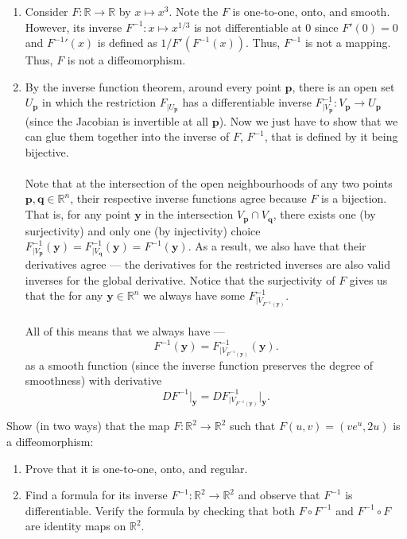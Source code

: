 \documentclass[12 pt, letterpaper]{hmcpset}
\begin{document}
\begin{solution}
	\begin{enumerate}
		\item
			Consider $F : \mathbb{R} \to \mathbb{R}$ by $x \mapsto x^3$. Note the $F$ is one-to-one, onto, and smooth. However, its inverse $F^{-1} : x \mapsto x^{1/3}$ is not differentiable at $0$ since $F'(0) = 0$ and ${F^{-1}}'(x)$ is defined as $1/F'(F^{-1}(x))$. Thus, $F^{-1}$ is not a mapping. Thus, $F$ is not a diffeomorphism.
		\item
			By the inverse function theorem, around every point $\mathbf{p}$, there is an open set $U_{\mathbf{p}}$ in which the restriction $F_{|U_{\mathbf{p}}}$ has a differentiable inverse $F^{-1}_{|V_{\mathbf{p}}} : V_{\mathbf{p}} \to U_{\mathbf{p}}$ (since the Jacobian is invertible at all $\mathbf{p}$). Now we just have to show that we can glue them together into the inverse of $F$, $F^{-1}$, that is defined by it being bijective. \\\\
			Note that at the intersection of the open neighbourhoods of any two points $\mathbf{p}, \mathbf{q} \in \mathbb{R}^n$, their respective inverse functions agree because $F$ is a bijection. That is, for any point $\mathbf{y}$ in the intersection $V_\mathbf{p} \cap V_\mathbf{q}$, there exists one (by surjectivity) and only one (by injectivity) choice $F^{-1}_{|V_\mathbf{p}}(\mathbf{y}) = F^{-1}_{|V_\mathbf{q}}(\mathbf{y}) = F^{-1}(\mathbf{y})$. As a result, we also have that their derivatives agree --- the derivatives for the restricted inverses are also valid inverses for the global derivative. Notice that the surjectivity of $F$ gives us that the for any $\mathbf{y} \in \mathbb{R}^{n}$ we always have some $F^{-1}_{|V_{F^{-1}(\mathbf{y})}}$. \\\\
			All of this means that we always have ---
			\[
				F^{-1}(\mathbf{y}) = F^{-1}_{|V_{F^{-1}(\mathbf{y})}}(\mathbf{y}).
			\]
			as a smooth function (since the inverse function preserves the degree of smoothness) with derivative
			\[
				DF^{-1} \Big |_{\mathbf{y}} = DF^{-1}_{|V_{F^{-1}(\mathbf{y})}} \Big |_{\mathbf{y}}.
			\]
	\end{enumerate}
\end{solution}

\pagebreak

\begin{problem}[Problem 2.]
	Show (in two ways) that the map $F : \mathbb{R}^2 \to \mathbb{R}^2$ such that $F(u, v) = (v e^u, 2u)$ is a diffeomorphism:
	\begin{enumerate}
		\item Prove that it is one-to-one, onto, and regular.
		\item Find a formula for its inverse  $F^{-1} : \mathbb{R}^2 \to \mathbb{R}^2$ and observe that $F^{-1}$ is differentiable. Verify the formula by checking that both $F \circ F^{-1}$ and $F^{-1} \circ F$ are identity maps on $\mathbb{R}^2$.
	\end{enumerate}
\end{problem}
\end{document}
